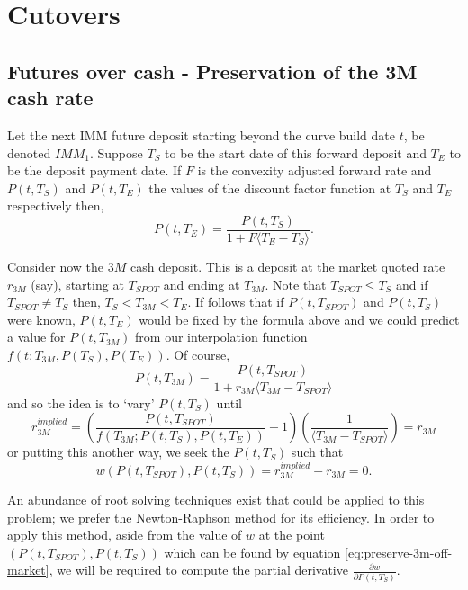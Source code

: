 \documentclass[a4paper]{article}
\begin{document}
\section{Cutovers}

\subsection{Futures over cash - Preservation of the 3M cash rate}

Let the next IMM future deposit starting beyond the curve build date $t$, be denoted $IMM_{1}$. Suppose $T_{S}$ to be the start date of this forward deposit and $T_{E}$ to be the deposit payment date. If $F$ is the convexity adjusted forward rate and $P(t, T_{S})$ and $P(t, T_{E})$ the values of the discount factor function at $T_{S}$ and $T_{E}$ respectively then,
  \begin{equation}
    P(t, T_{E}) = \frac{P(t, T_{S})}{1 + F\langle T_{E} - T_{S}\rangle}. \label{eq:future-end-discount-factor}
  \end{equation}

Consider now the $3M$ cash deposit. This is a deposit at the market quoted rate $r_{3M}$ (say), starting at $T_{SPOT}$ and ending at $T_{3M}$. Note that $T_{SPOT}\leq T_{S}$ and if $T_{SPOT}\ne T_{S}$ then, $T_{S} < T_{3M} < T_{E}$. If follows that if $P(t, T_{SPOT})$ and $P(t, T_{S})$ were known, $P(t, T_{E})$ would be fixed by the formula above and we could predict a value for $P(t, T_{3M})$ from our interpolation function $f(t; T_{3M}, P(T_{S}), P(T_{E}))$. Of course,
\[P(t, T_{3M}) = \frac{P(t, T_{SPOT})}{1 + r_{3M}\langle T_{3M}-T_{SPOT}\rangle}\] and so the idea is to `vary' $P(t, T_{S})$ until 
  \begin{equation}
    r^{implied}_{3M} = \left(\frac{P(t, T_{SPOT})}{f(T_{3M}; P(t, T_{S}), P(t, T_{E}))} - 1\right)\left(\frac{1}{\langle T_{3M}-T_{SPOT}\rangle}\right) = r_{3M} \label{eq:preserve-3m-off-market}
  \end{equation}
or putting this another way, we seek the $P(t, T_{S})$ such that 
\begin{equation}
  w\left(P(t, T_{SPOT}), P(t, T_{S})\right) = r^{implied}_{3M} - r_{3M} = 0. \label{eq:preserve-3m-off-market-target-function}
\end{equation}

An abundance of root solving techniques exist that could be applied to this problem; we prefer the Newton-Raphson method for its efficiency. In order to apply this method, aside from the value of $w$ at the point $(P(t, T_{SPOT}), P(t, T_{S}))$ which can be found by equation \ref{eq:preserve-3m-off-market}, we will be required to compute the partial derivative $\frac{\partial{w}}{\partial{P(t, T_{S})}}$.
\end{document}
